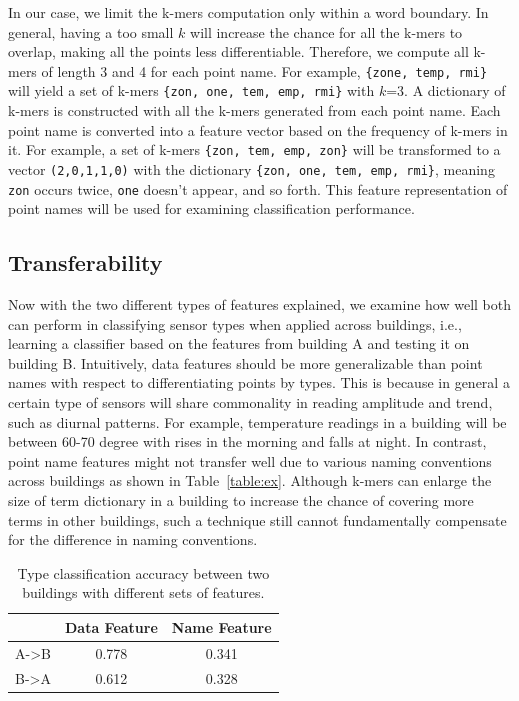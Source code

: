 In our case, we limit the k-mers computation only within a word boundary.
In general, having a too small $k$ will increase the chance for all the k-mers to overlap, making all the points less differentiable.
Therefore, we compute all k-mers of length 3 and 4 for each point name.
For example, \texttt{\{zone, temp, rmi\}} will yield a set of k-mers \texttt{\{zon, one, tem, emp, rmi\}} with $k$=3.
A dictionary of k-mers is constructed with all the k-mers generated from each point name. 
Each point name is converted into a feature vector based on the frequency of k-mers in it. 
For example, a set of k-mers \texttt{\{zon, tem, emp, zon\}} will be transformed to a vector
\texttt{(2,0,1,1,0)} with the dictionary \texttt{\{zon, one, tem, emp, rmi\}}, meaning \texttt{zon} occurs twice, \texttt{one} doesn't appear, and so forth. 
This feature representation of point names will be used for examining classification performance.

\subsection{Transferability}
Now with the two different types of features explained, we examine how well both can perform in classifying sensor types when applied across buildings, i.e., learning a classifier based on the features from building A and testing it on building B. 
Intuitively, data features should be more generalizable than point names with respect to differentiating points by types. 
This is because in general a certain type of sensors will share commonality in reading amplitude and trend, such as diurnal patterns. 
For example, temperature readings in a building will be between 60-70 degree with rises in the morning and falls at night.
In contrast, point name features might not transfer well due to various naming conventions across buildings as shown in Table~\ref{table:ex}.
Although k-mers can enlarge the size of term dictionary in a building to increase the chance of covering more terms in other buildings, such a technique still cannot fundamentally compensate for the difference in naming conventions.

\begin{table}[h]
\centering
\begin{tabular}{l|c|c}
\hline
                & Data Feature & Name Feature \\ \hline
A-\textgreater B & 0.778       & 0.341       \\
B-\textgreater A & 0.612       & 0.328       \\ \hline
\end{tabular}
\caption{Type classification accuracy between two buildings with different sets of features.}
\label{table:clf}
\end{table}


